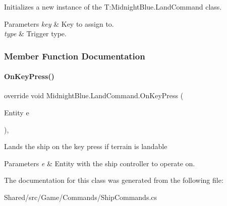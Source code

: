 Initializes a new instance of the T\+:\+Midnight\+Blue.\+Land\+Command class. 


\begin{DoxyParams}{Parameters}
{\em key} & Key to assign to.\\
\hline
{\em type} & Trigger type.\\
\hline
\end{DoxyParams}


\subsubsection{Member Function Documentation}
\hypertarget{class_midnight_blue_1_1_land_command_a2c496d96aed4498bb3ca133fcea4b172}{}\label{class_midnight_blue_1_1_land_command_a2c496d96aed4498bb3ca133fcea4b172} 
\paragraph{\texorpdfstring{On\+Key\+Press()}{OnKeyPress()}}
{\footnotesize\ttfamily override void Midnight\+Blue.\+Land\+Command.\+On\+Key\+Press (\begin{DoxyParamCaption}\item[{Entity}]{e }\end{DoxyParamCaption})\hspace{0.3cm}{\ttfamily [inline]}, {\ttfamily [protected]}}



Lands the ship on the key press if terrain is landable 


\begin{DoxyParams}{Parameters}
{\em e} & Entity with the ship controller to operate on.\\
\hline
\end{DoxyParams}


The documentation for this class was generated from the following file\+:\begin{DoxyCompactItemize}
\item 
Shared/src/\+Game/\+Commands/Ship\+Commands.\+cs\end{DoxyCompactItemize}
